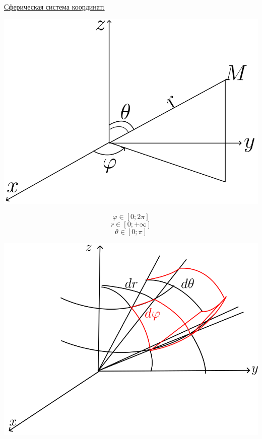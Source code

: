 \documentclass[12pt]{article}
\let\ORIincludegraphics\includegraphics
\renewcommand{\includegraphics}[2][]{\ORIincludegraphics[scale=0.65,#1]{#2}}
\begin{document}
  \par
  \underline{Сферическая система координат:}\\
  \par
  \begin{minipage}{0.45\textwidth}
    \includegraphics[scale=0.6]{8.25.2.png}
  \end{minipage}
  \hspace{1em}
  \begin{minipage}{0.55\textwidth}
    \[\varphi \in [0;2\pi]\]
    \[r \in [0;+\infty]\]
    \[\theta \in [0;\pi]\]
  \end{minipage}
  \vspace{1em}
  \par
  \begin{minipage}{0.45\textwidth}
    \includegraphics[scale=0.5]{8.25.3.png}
  \end{minipage}
\end{document}
